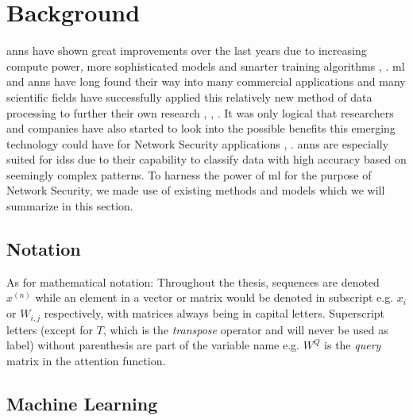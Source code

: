 \chapter{Background} \label{sec:background}

\glspl{ann} have shown great improvements over the last years due to increasing compute power, more sophisticated models and smarter training algorithms \cite{reboot_acgan}, \cite{unsupervised_learning_video_segmentation}. \gls{ml} and \glspl{ann} have long found their way into many commercial applications and many scientific fields have successfully applied this relatively new method of data processing to further their own research \cite{alpha_fold}, \cite{ai_medicine}, \cite{ai_antibiotic}. It was only logical that researchers and companies have also started to look into the possible benefits this emerging technology could have for Network Security applications \cite{kitsune}, \cite{ml_ids_survey}. \glspl{ann} are especially suited for \glspl{ids} due to their capability to classify data with high accuracy based on seemingly complex patterns. To harness the power of \gls{ml} for the purpose of Network Security, we made use of existing methods and models which we will summarize in this section.

\section{Notation} \label{sec:background:terminology:notation}

As for mathematical notation: Throughout the thesis, sequences are denoted $x^{(n)}$ while an element in a vector or matrix would be denoted in subscript e.g. $x_i$ or $W_{i,j}$ respectively, with matrices always being in capital letters. Superscript letters (except for $T$, which is the \textit{transpose} operator and will never be used as label) without parenthesis are part of the variable name e.g. $W^Q$ is the \textit{query} matrix in the attention function. 

\section{Machine Learning} \label{sec:background:ml}

